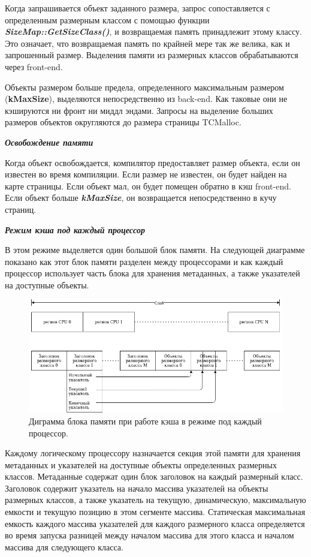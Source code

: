 Когда запрашивается объект заданного размера, запрос сопоставляется с определенным размерным классом с помощью функции \textit{\textbf{SizeMap::GetSizeClass()}}, и возвращаемая память принадлежит этому классу. Это означает, что возвращаемая память по крайней мере так же велика, как и запрошенный размер. Выделения памяти из размерных классов обрабатываются через front-end.

Объекты размером больше предела, определенного максимальным размером (\textbf{kMaxSize}), выделяются непосредственно из back-end. Как таковые они не кэшируются ни фронт ни миддл эндами. Запросы на выделение больших размеров объектов округляются до размера страницы TCMalloc.

\bigbreak
\textit{\textbf{Освобождение памяти}}

Когда объект освобождается, компилятор предоставляет размер объекта, если он известен во время компиляции. Если размер не известен, он будет найден на карте страницы. Если объект мал, он будет помещен обратно в кэш front-end. Если объект больше \textbf{\textit{kMaxSize}}, он возвращается непосредственно в кучу страниц.

\bigbreak
\textit{\textbf{Режим кэша под каждый процессор}}

В этом режиме выделяется один большой блок памяти. На следующей диаграмме показано как этот блок памяти разделен между процессорами и как каждый процессор использует часть блока для хранения метаданных, а также указателей на доступные объекты.

\begin{figure}[!h]
	\begin{center}
		\includegraphics[scale=0.6]{images/tcmalloc-per-cpu.png}
		\caption{Диграмма блока памяти при работе кэша в режиме под каждый процессор.}
		\label{tcmalloc-per-cpu}
	\end{center}
\end{figure}

Каждому логическому процессору назначается секция этой памяти для хранения метаданных и указателей на доступные объекты определенных размерных классов. Метаданные содержат один блок заголовок на каждый размерный класс. Заголовок содержит указатель на начало массива указателей на объекты размерных классов, а также указатель на текущую, динамическую, максимальную емкости и текущую позицию в этом сегменте массива. Статическая максимальная емкость каждого массива указателей для каждого размерного класса определяется во время запуска разницей между началом массива для этого класса и началом массива для следующего класса.

